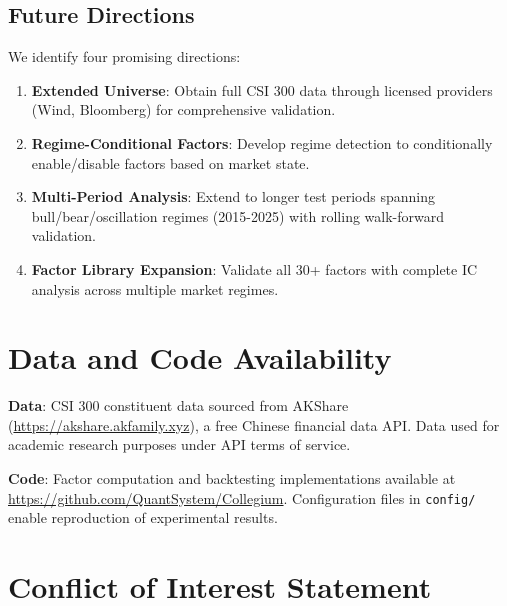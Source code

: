 \documentclass[12pt]{article}
\begin{document}
\subsection{Future Directions}

We identify four promising directions:

\begin{enumerate}
    \item \textbf{Extended Universe}: Obtain full CSI 300 data through licensed providers (Wind, Bloomberg) for comprehensive validation.

    \item \textbf{Regime-Conditional Factors}: Develop regime detection to conditionally enable/disable factors based on market state.

    \item \textbf{Multi-Period Analysis}: Extend to longer test periods spanning bull/bear/oscillation regimes (2015-2025) with rolling walk-forward validation.

    \item \textbf{Factor Library Expansion}: Validate all 30+ factors with complete IC analysis across multiple market regimes.
\end{enumerate}

\section*{Data and Code Availability}

\textbf{Data}: CSI 300 constituent data sourced from AKShare (\url{https://akshare.akfamily.xyz}), a free Chinese financial data API. Data used for academic research purposes under API terms of service.

\textbf{Code}: Factor computation and backtesting implementations available at \url{https://github.com/QuantSystem/Collegium}. Configuration files in \texttt{config/} enable reproduction of experimental results.

\section*{Conflict of Interest Statement}
\end{document}
